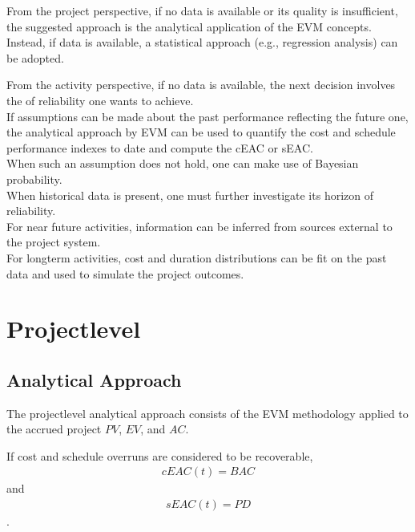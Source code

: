 \documentclass[letterpaper,10pt,english]{jupyterBook}
\begin{document}
\sphinxAtStartPar
From the project perspective, if no data is available or its quality is insufficient, the suggested approach is the analytical application of the EVM concepts. \\
Instead, if data is available, a statistical approach (e.g., regression analysis) can be adopted.

\sphinxAtStartPar
From the activity perspective, if no data is available, the next decision involves the  of reliability one wants to achieve. \\
If assumptions can be made about the past performance reflecting the future one, the analytical approach by EVM can be used to quantify the cost and schedule performance indexes to date and compute the cEAC or sEAC. \\
When such an assumption does not hold, one can make use of Bayesian probability. \\
When historical data is present, one must further investigate its horizon of reliability. \\
For near future activities, information can be inferred from sources external to the project system. \\
For long\sphinxhyphen{}term activities, cost and duration distributions can be fit on the past data and used to simulate the project outcomes.


\section{Project\sphinxhyphen{}level}
\label{\detokenize{PM/eac:project-level}}

\subsection{Analytical Approach}
\label{\detokenize{PM/eac:analytical-approach}}
\sphinxAtStartPar
The project\sphinxhyphen{}level analytical approach consists of the EVM methodology applied to the accrued project \(PV\), \(EV\), and \(AC\).

\sphinxAtStartPar
If cost and schedule overruns are considered to be recoverable,
\begin{equation*}
\begin{split}
cEAC{(t)} = BAC
\end{split}
\end{equation*}
\sphinxAtStartPar
and
\begin{equation*}
\begin{split}
sEAC{(t)} = PD
\end{split}
\end{equation*}
\sphinxAtStartPar
.
\end{document}
